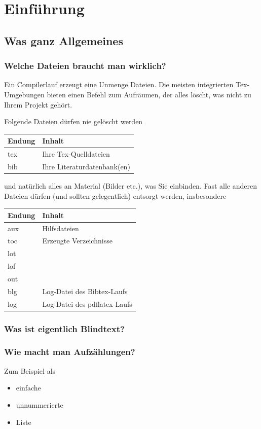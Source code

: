\chapter{Einführung} 
\section{Was ganz Allgemeines}
\subsection{Welche Dateien braucht man wirklich?}
Ein Compilerlauf erzeugt eine Unmenge Dateien. Die meisten integrierten Tex-Umgebungen bieten einen Befehl zum Aufräumen, der alles löscht, was nicht zu Ihrem Projekt gehört.

Folgende Dateien dürfen nie gelöscht werden

\begin{tabu}{|X[0.5] | X[3] |}
\hline
\rowfont{\bfseries} Endung & Inhalt \\
\hline
tex & Ihre Tex-Quelldateien\\
bib & Ihre Literaturdatenbank(en)\\
\hline
\end{tabu}
und natürlich alles an Material (Bilder etc.), was Sie einbinden. Fast alle anderen Dateien dürfen (und sollten gelegentlich) entsorgt werden, insbesondere

\begin{tabu}{|X[0.5] | X[3] |}
\hline
\rowfont{\bfseries} Endung & Inhalt \\
\hline
aux & Hilfsdateien\\
toc & Erzeugte Verzeichnisse\\
lot & \\
lof & \\
out & \\
blg & Log-Datei des Bibtex-Laufs \\
log & Log-Datei des pdflatex-Laufs\\
\hline
\end{tabu}


\subsection{Was ist eigentlich Blindtext?}

\blindtext
\subsection{Wie macht man Aufzählungen?}
Zum Beispiel als
\begin{itemize}
\item einfache
\item unnummerierte
\item Liste
\end{itemize}

